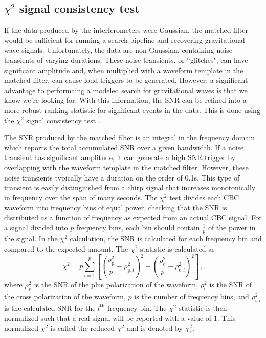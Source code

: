 \subsection{$\chi^{2}$ signal consistency test}\label{sec:chisq}

If the data produced by the interferometers were Gaussian, the matched filter would 
be sufficient for running a search pipeline and recovering gravitational wave signals. 
Unfortunately, the data are non-Gaussian, containing noise transients of varying 
durations. These noise transients, or ``glitches", can have significant amplitude 
and, when multiplied with a waveform template in the matched filter, can cause 
loud triggers to be generated. 
However, a significant advantage to performaing a modeled search for gravitational 
waves is that 
we know we're looking for. With this information, the SNR can be refined into a more 
robust ranking statistic for significant events in the data. This is done using the 
$\chi^{2}$ signal consistency test \cite{Allen:2004gu}. 

The SNR produced by the matched filter is an integral in the frequency domain which 
reports the total accumulated SNR over a given bandwidth. If a noise transient has 
significant amplitude, it can generate a high SNR trigger by overlapping with the 
waveform template in the matched filter. However, these noise 
transients typically have a duration on the order of 0.1s. This type of transient 
is easily distinguished from a chirp signal that increases monotonically in frequency 
over the span of many seconds. 
The $\chi^{2}$ test divides each CBC waveform into
frequency bins of equal power, checking that the SNR is distributed as a 
function of frequency
as expected from an actual CBC signal.
For a signal divided into $p$ frequency bins, each bin should contain $\frac{1}{p}$ of the power in the 
signal. 
In the $\chi^2$ calculation, the SNR is calculated for each frequency bin and compared to the expected 
amount. The $\chi^2$ statistic is calculated as \cite{Usman:2015kfa}
\begin{equation}
\chi^2 = p\displaystyle\sum_{l=1}^{p}\left[\left(\frac{\rho_\mathrm{p}^2}{p}-\rho_{\mathrm{p},l}^2\right)^2 + \left(\frac{\rho^2_\mathrm{c}}{p}-\rho_{\mathrm{c},l}^2\right)^2 \right] \, ,
\label{eq:chisqr}
\end{equation}
where $\rho^2_\mathrm{p}$ is the SNR of the plus polarization of the waveform, $\rho^2_\mathrm{c}$ 
is the SNR of the cross 
polarization of the waveform, $p$ is the number of frequency bins, and 
$\rho^2_{i,l}$ is the calculated SNR for the $l^\mathrm{th}$ frequency bin.
The $\chi^2$ statistic is then normalized such that a real signal will be reported with a value of 1. 
This normalized $\chi^2$ is called the reduced $\chi^2$ and is denoted by $\chi^2_r$.

